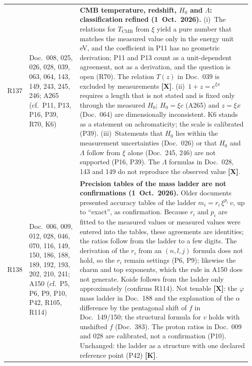 \begin{longtable}{@{}p{0.9cm}p{3.1cm}p{10.2cm}@{}}
R137 & Doc.~008, 025, 026, 028, 039, 063, 064, 143, 149, 243, 245, 246; A265 (cf.\ P11, P13, P16, P39, R70, K6) & \textbf{CMB temperature, redshift, $H_0$ and $\Lambda$: classification refined (1~Oct.~2026).} (i)~The relations for $T_{\mathrm{CMB}}$ from $\xi$ yield a pure number that matches the measured value only in the energy unit eV, and the coefficient in P11 has no geometric derivation; P11 and P13 count as a unit-dependent agreement, not as a derivation, and the question is open (R70). The relation $T(z)$ in Doc.~039 is excluded by measurements \textbf{[X]}. (ii)~$1+z=e^{\xi x}$ requires a length that is not stated and is fixed only through the measured $H_0$; $H_0=\xi c$ (A265) and $z=\xi x$ (Doc.~064) are dimensionally inconsistent. K6 stands as a statement on achromaticity; the scale is calibrated (P39). (iii)~Statements that $H_0$ lies within the measurement uncertainties (Doc.~026) or that $H_0$ and $\Lambda$ follow from $\xi$ alone (Doc.~245, 246) are not supported (P16, P39). The $\Lambda$ formulas in Doc.~028, 143 and 149 do not reproduce the observed value \textbf{[X]}. \\
R138 & Doc.~006, 009, 012, 028, 046, 070, 116, 149, 150, 186, 188, 189, 192, 193, 202, 210, 241; A150 (cf.\ P5, P6, P9, P10, P42, R105, R114) & \textbf{Precision tables of the mass ladder are not confirmations (1~Oct.~2026).} Older documents presented accuracy tables of the ladder $m_i = r_i\,\xi^{p_i}\,v$, up to ``exact'', as confirmation. Because $r_i$ and $p_i$ are fitted to the measured values or measured values were entered into the tables, these agreements are identities; the ratios follow from the ladder to a few digits. The derivation of the $r_i$ from an $(n,l,j)$ formula does not hold, so the $r_i$ remain settings (P6, P9); likewise the charm and top exponents, which the rule in A150 does not generate. Koide follows from the ladder only approximately (confirms R114). Not tenable \textbf{[X]}: the $\varphi$ mass ladder in Doc.~188 and the explanation of the $\alpha$ difference by the pentagonal shift of $f$ in Doc.~149/150; the structural formula for $v$ holds with unshifted $f$ (Doc.~383). The proton ratios in Doc.~009 and 028 are calibrated, not a confirmation (P10). Unchanged: the ladder as a structure with one declared reference point (P42) \textbf{[K]}. \\

\end{longtable}
